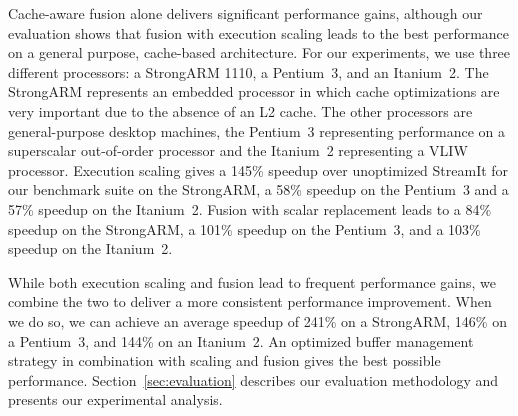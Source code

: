 Cache-aware fusion alone delivers significant performance gains,
although our evaluation shows that fusion with execution scaling leads
to the best performance on a general purpose, cache-based
architecture. For our experiments, we use three different processors:
a StrongARM 1110, a Pentium~3, and an Itanium~2.  The StrongARM
represents an embedded processor in which cache optimizations are very
important due to the absence of an L2 cache.  The other processors are
general-purpose desktop machines, the Pentium~3 representing
performance on a superscalar out-of-order processor and the Itanium~2
representing a VLIW processor.  Execution scaling gives a 145\%
speedup over unoptimized StreamIt for our benchmark suite on the
StrongARM, a 58\% speedup on the Pentium~3 and a 57\% speedup on the
Itanium~2.  Fusion with scalar replacement leads to a 84\% speedup on
the StrongARM, a 101\% speedup on the Pentium~3, and a 103\% speedup
on the Itanium~2.

While both execution scaling and fusion lead to frequent performance gains, we
combine the two to deliver a more consistent performance improvement. When we
do so, we can achieve an average speedup of 241\% on a
StrongARM, 146\% on a Pentium~3, and 144\% on 
an Itanium~2. An optimized buffer management strategy in
combination with scaling and fusion gives the best possible performance.
Section~\ref{sec:evaluation} describes our evaluation
methodology and presents our experimental analysis.


